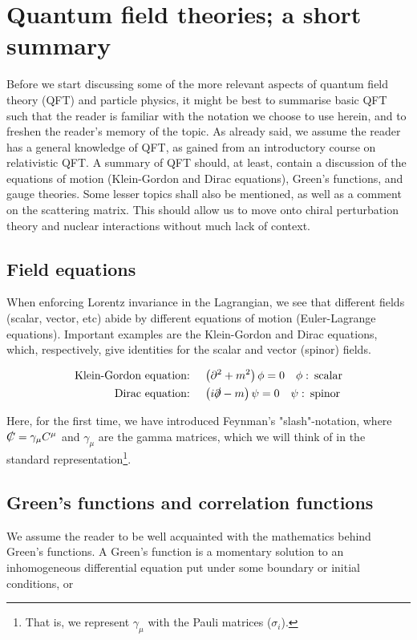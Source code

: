 \documentclass[10pt,twoside]{report}
\begin{document}
	\section{Quantum field theories; a short summary}
	
	Before we start discussing some of the more relevant aspects of quantum field theory (QFT) and particle physics, it might be best to summarise basic QFT such that the reader is familiar with the notation we choose to use herein, and to freshen the reader's memory of the topic. As already said, we assume the reader has a general knowledge of QFT, as gained from an introductory course on relativistic QFT. A summary of QFT should, at least, contain a discussion of the equations of motion (Klein-Gordon and Dirac equations), Green's functions, and gauge theories. Some lesser topics shall also be mentioned, as well as a comment on the scattering matrix. This should allow us to move onto chiral perturbation theory and nuclear interactions without much lack of context.
	
	\subsection{Field equations}
	When enforcing Lorentz invariance in the Lagrangian, we see that different fields (scalar, vector, etc) abide by different equations of motion (Euler-Lagrange equations). Important examples are the Klein-Gordon and Dirac equations, which, respectively, give identities for the scalar and vector (spinor) fields.
	
	\begin{align}
		\text{Klein-Gordon equation:}\:&\quad \left(\partial^2 + m^2\right)\phi = 0\quad \phi:\:\text{scalar}\\
		\text{Dirac equation:}\:&\quad \left(i\slashed\partial - m\right)\psi = 0\quad \psi:\:\text{spinor}
	\end{align}
	
	Here, for the first time, we have introduced Feynman's "slash"-notation, where $\slashed C = \gamma_\mu C^\mu$ and $\gamma_\mu$ are the gamma matrices, which we will think of in the standard representation\footnote{That is, we represent $\gamma_\mu$ with the Pauli matrices ($\sigma_i$).}.
	
	\subsection{Green's functions and correlation functions}
	We assume the reader to be well acquainted with the mathematics behind Green's functions. A Green's function is a momentary solution to an inhomogeneous differential equation put under some boundary or initial conditions, or
	
\end{document}

